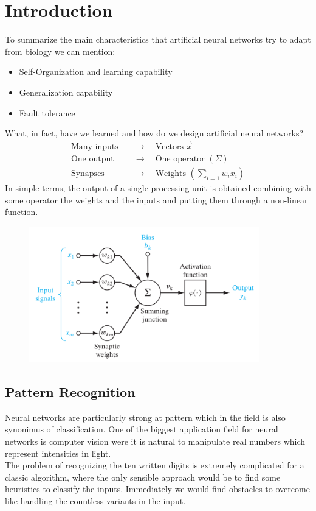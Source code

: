\section{Introduction}
To summarize the main characteristics that artificial neural networks try to adapt from biology we can mention:
\begin{itemize}
    \item Self-Organization and learning capability
    \item Generalization capability
    \item Fault tolerance
\end{itemize}
What, in fact, have we learned and how do we design artificial neural networks?
\begin{align*}
    \text{Many inputs} \quad &\longrightarrow \quad \text{Vectors } \vec{x}\\
    \text{One output} \quad &\longrightarrow \quad \text{One operator } \left( \Sigma \right)\\
    \text{Synapses} \quad &\longrightarrow \quad \text{Weights } \left( \sum_{i=1}^{}{w_ix_i} \right)
\end{align*}
In simple terms, the output of a single processing unit is obtained combining with some operator the weights and the inputs and putting them through a non-linear function.
\begin{figure}[htbp]
    \centering
    \includegraphics[width=10cm]{Introduction/perceptron-model.png}
\end{figure}
\subsection*{Pattern Recognition}
Neural networks are particularly strong at pattern which in the field is also synonimus of classification. One of the biggest application field for neural networks is computer vision were it is natural to manipulate real numbers which represent intensities in light.\\
The problem of recognizing the ten written digits is extremely complicated for a classic algorithm, where the only sensible approach would be to find some heuristics to classify the inputs. Immediately we would find obstacles to overcome like handling the countless variants in the input.
